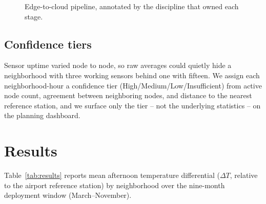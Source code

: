 \documentclass[10pt,twocolumn]{article}
\begin{document}
\begin{figure}[t]
\centering
{}
\caption{Edge-to-cloud pipeline, annotated by the discipline that owned each stage.}
\label{fig:pipeline}
\end{figure}

\subsection{Confidence tiers}
Sensor uptime varied node to node, so raw averages could quietly hide a neighborhood with three
working sensors behind one with fifteen. We assign each neighborhood-hour a confidence tier
(High/Medium/Low/Insufficient) from active node count, agreement between neighboring nodes, and
distance to the nearest reference station, and we surface only the tier -- not the underlying
statistics -- on the planning dashboard.

\section{Results}
Table~\ref{tab:results} reports mean afternoon temperature differential ($\Delta T$, relative to
the airport reference station) by neighborhood over the nine-month deployment window
(March--November).
\end{document}
